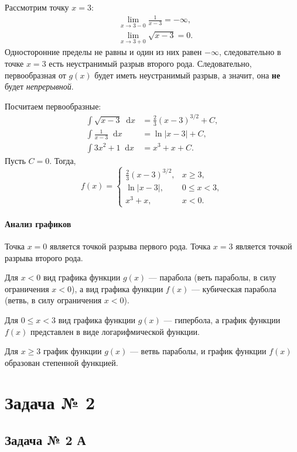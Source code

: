 \documentclass[a4paper,12pt]{article}
\newcommand*\diff{\mathop{}\!\mathrm{d}}
\begin{document}
Рассмотрим точку \(x = 3\):
\begin{align*}
  &\lim_{x \to 3 - 0} \frac{1}{x - 3} = -\infty, \\
  &\lim_{x \to 3 + 0} \sqrt{x - 3} = 0.
\end{align*}
Односторонние пределы не равны и один из них равен \(-\infty\),
следовательно в точке \(x = 3\) есть неустранимый разрыв второго рода.
Следовательно, первообразная от \(g(x)\) будет иметь
неустранимый разрыв, а значит, она \textbf{не} будет \textit{непрерывной}.

Посчитаем первообразные:
\begin{align*}
  \int \sqrt{x - 3} \diff x &= \frac{2}{3} {(x - 3)}^{3/2} + C, \\
  \int \frac{1}{x - 3} \diff x &= \ln|x - 3| + C, \\
  \int 3 x^2 + 1 \diff x &= x^3 + x + C.
\end{align*}
Пусть \(C = 0\).
Тогда,
\begin{equation}
  f(x) =
  \begin{cases}
    \frac{2}{3} {(x - 3)}^{3/2}, & x \ge 3, \\
    \ln|x - 3|, & 0 \le x < 3, \\
    x^3 + x, & x < 0.
  \end{cases}
\end{equation}

\paragraph{Анализ графиков}

Точка \(x = 0\) является точкой разрыва первого рода.
Точка \(x = 3\) является точкой разрыва второго рода.

Для \(x < 0\) вид графика функции \(g(x)\) --- парабола
(веть параболы, в силу ограничения \(x < 0\)),
а вид графика функции \(f(x)\) --- кубическая парабола
(ветвь, в силу ограничения \(x < 0\)).

Для \(0 \le x < 3\) вид графика функции \(g(x)\) --- гипербола,
а график функции \(f(x)\) представлен в виде логарифмической функции.

Для \(x \ge 3\) график функции \(g(x)\) --- ветвь параболы,
и график функции \(f(x)\) образован степенной функцией.

\section{Задача № 2}

\subsection{Задача № 2 А}
\end{document}
